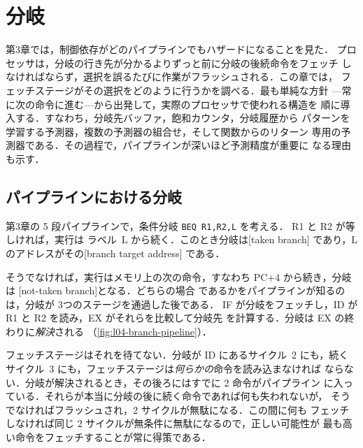\documentclass[../main.tex]{subfiles}
\begin{document}
\chapter{分岐}

第3章では，制御依存がどのパイプラインでもハザードになることを見た．
プロセッサは，分岐の行き先が分かるよりずっと前に分岐の後続命令をフェッチ
しなければならず，選択を誤るたびに作業がフラッシュされる．この章では，
フェッチステージがその選択をどのように行うかを調べる．最も単純な方針
---常に次の命令に進む---から出発して，実際のプロセッサで使われる構造を
順に導入する．すなわち，分岐先バッファ，飽和カウンタ，分岐履歴から
パターンを学習する予測器，複数の予測器の組合せ，そして関数からのリターン
専用の予測器である．その過程で，パイプラインが深いほど予測精度が重要に
なる理由も示す．

\section{パイプラインにおける分岐}
\label{sec:l04-branch-pipeline}

第3章の 5 段パイプラインで，条件分岐 \texttt{BEQ R1,R2,L} を考える．
R1 と R2 が等しければ，実行は
ラベル~L から続く．このとき分岐は[taken branch]%
であり，L のアドレスがその[branch target address]%
である．

そうでなければ，実行はメモリ上の次の命令，すなわち PC+4 から続き，分岐は
[not-taken branch]となる．どちらの場合
であるかをパイプラインが知るのは，分岐が 3つのステージを通過した後である．
IF が分岐をフェッチし，ID が R1 と R2 を読み，EX がそれらを比較して分岐先
を計算する．分岐は EX の終わりに\emph{解決}される
（\cref{fig:l04-branch-pipeline}）．

フェッチステージはそれを待てない．分岐が ID にあるサイクル~2 にも，続く
サイクル~3 にも，フェッチステージは\emph{何らかの}命令を読み込まなければ
ならない．分岐が解決されるとき，その後ろにはすでに 2 命令がパイプライン
に入っている．それらが本当に分岐の後に続く命令であれば何も失われないが，
そうでなければフラッシュされ，2 サイクルが無駄になる．この間に何も
フェッチしなければ同じ 2 サイクルが無条件に無駄になるので，正しい可能性が
最も高い命令をフェッチすることが常に得策である．
\end{document}
